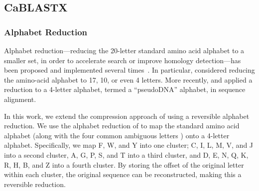 \documentclass[review,preprint,12pt]{elsarticle}
\renewcommand{\cite}{\citep} %
\theoremstyle{definition}
\theoremstyle{remark}
\begin{document}
%

\subsection{CaBLASTX}

\subsubsection{Alphabet Reduction}

Alphabet reduction---reducing the 20-letter standard amino acid alphabet to a
smaller set, in order to accelerate search or improve homology detection---has
been proposed and implemented several times~\cite{bacardit2007automated, peterson2009reduced}.
In particular, \citet{murphy2000simplified} considered reducing the
amino-acid alphabet to 17, 10, or even 4 letters.
More recently, \citet{zhao2012rapsearch2} and \citet{huson2013poor} applied a reduction to
a 4-letter alphabet, termed a ``pseudoDNA'' alphabet, in sequence alignment.

In this work, we extend the compression approach of 
\citet{daniels2013compressive} using a reversible alphabet reduction.
We use the alphabet reduction of \citet{murphy2000simplified} to map the 
standard amino
acid alphabet (along with the four common ambiguous letters ) onto a 4-letter 
alphabet.
Specifically, we map F, W, and Y into one cluster; C, I, L, M, V, and J into
a second cluster, A, G, P, S, and T into a third cluster, and
D, E, N, Q, K, R, H, B, and Z into a fourth cluster.
By storing the offset of the original letter within each cluster, the original
sequence can be reconstructed, making this a reversible reduction.
\end{document}
